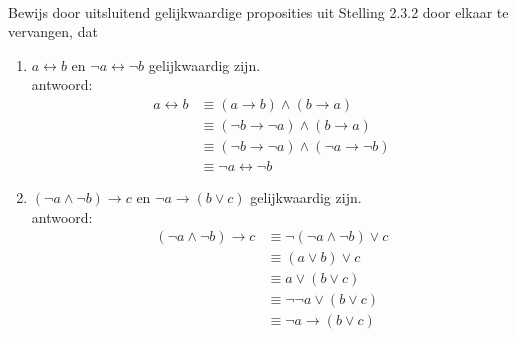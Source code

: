 \newpage
\begin{answer}\mbox{}\\ %
Bewijs door uitsluitend gelijkwaardige proposities uit Stelling 2.3.2 door elkaar te vervangen, dat
\begin{enumerate}[label=\textit{\alph*.}]
\item $a\leftrightarrow b$ en $\neg a \leftrightarrow \neg b$ gelijkwaardig zijn.\\
antwoord:
\begin{align}
a\leftrightarrow b &\equiv (a \rightarrow b)\wedge  (b\rightarrow a) \tag{St-2.3.2: 4}\\
&\equiv (\neg b \rightarrow \neg a)\wedge  (b\rightarrow a) \tag{St-2.3.2: 7}\\
&\equiv (\neg b \rightarrow \neg a)\wedge  (\neg a \rightarrow \neg b) \tag{St-2.3.2: 7}\\
&\equiv \neg a\leftrightarrow \neg b \tag{St-2.3.2: 4}
\end{align}
\item $(\neg a\land\neg b)\rightarrow c$ en $\neg a\rightarrow(b\lor c)$ gelijkwaardig zijn. \\
antwoord:
\begin{align}
(\neg a\wedge \neg b)\rightarrow c &\equiv \neg (\neg a \wedge \neg b) \vee c \tag{St-2.3.2: 7}\\
&\equiv (a \vee b) \vee c \tag{St-2.3.2: 9}\\
&\equiv a \vee (b \vee c) \tag{St-2.3.2: 5}\\
&\equiv \neg \neg a\vee (b\vee c) \tag{St-2.3.2: 1}\\
&\equiv \neg a\rightarrow (b \vee c) \tag{St-2.3.2: 7}
\end{align}
\end{enumerate}
\end{answer}

